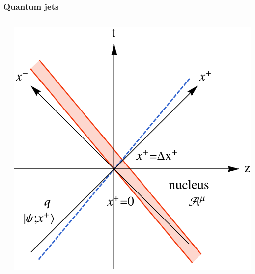 \documentclass[aspectratio=169,11pt,usenames,dvipsnames]{beamer}
\begin{document}
\begin{frame}
    \frametitle{Quantum jets}
    \vspace{-15pt}
    \begin{center}
        \begin{columns}[onlytextwidth,t]
           \begin{center}
                
            \end{center}

            \vspace{-10pt}
            \begin{center}
                \includegraphics[width=0.88\columnwidth]{images/qA_worldline_mono.pdf}
            \end{center}


\end{columns}
\end{center}
\end{frame}
\end{document}
